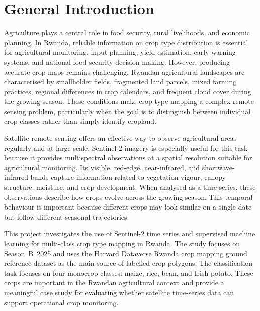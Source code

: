 
\chapter*{General Introduction}
\label{ch:intoGen}

Agriculture plays a central role in food security, rural livelihoods, and
economic planning. In Rwanda, reliable information on crop type distribution
is essential for agricultural monitoring, input planning, yield estimation,
early warning systems, and national food-security decision-making. However,
producing accurate crop maps remains challenging. Rwandan agricultural
landscapes are characterised by smallholder fields, fragmented land parcels,
mixed farming practices, regional differences in crop calendars, and frequent
cloud cover during the growing season. These conditions make crop type mapping
a complex remote-sensing problem, particularly when the goal is to distinguish
between individual crop classes rather than simply identify cropland.

Satellite remote sensing offers an effective way to observe agricultural areas
regularly and at large scale. Sentinel-2 imagery is especially useful for this
task because it provides multispectral observations at a spatial resolution
suitable for agricultural monitoring. Its visible, red-edge, near-infrared, and
shortwave-infrared bands capture information related to vegetation vigour,
canopy structure, moisture, and crop development. When analysed as a time
series, these observations describe how crops evolve across the growing season.
This temporal behaviour is important because different crops may look similar
on a single date but follow different seasonal trajectories.

This project investigates the use of Sentinel-2 time series and supervised
machine learning for multi-class crop type mapping in Rwanda. The study focuses
on Season~B~2025 and uses the Harvard Dataverse Rwanda crop mapping ground
reference dataset as the main source of labelled crop polygons. The
classification task focuses on four monocrop classes: maize, rice, bean, and
Irish potato. These crops are important in the Rwandan agricultural context and
provide a meaningful case study for evaluating whether satellite time-series
data can support operational crop monitoring.

